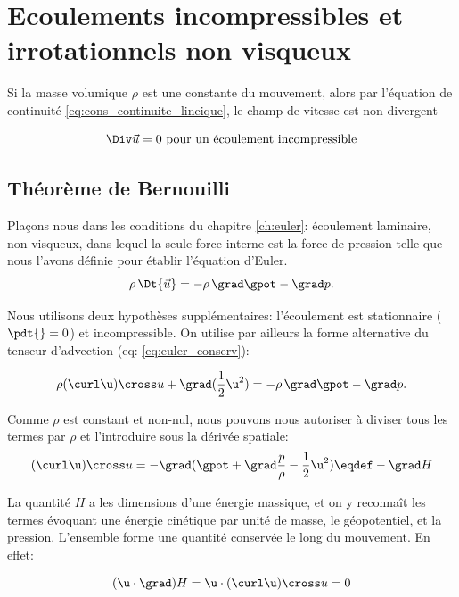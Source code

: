 \chapter{Ecoulements incompressibles et irrotationnels non visqueux}

Si la masse volumique $\rho$ est une constante du mouvement, alors par l'équation de continuité \eqref{eq:cons_continuite_lineique}, le champ de vitesse est non-divergent

\begin{equation}
  \Div \vec{u} = 0\text{ pour un écoulement incompressible}
\end{equation}


\section{Théorème de Bernouilli}

Plaçons nous dans les conditions du chapitre \ref{ch:euler}: écoulement laminaire, non-visqueux, dans lequel la seule force interne est la force de pression telle que nous l'avons définie pour établir l'équation d'Euler. 
\begin{equation}
  \rho \, \Dt{\vec{u}} = - \rho \, \grad \gpot - \grad p.
\end{equation}

Nous utilisons deux hypothèses supplémentaires: l'écoulement est stationnaire ($\pdt{}=0$) et incompressible. On utilise par ailleurs la forme alternative du tenseur d'advection (eq: \ref{eq:euler_conserv}):

\begin{equation}
  \rho (\curl \u)\cross u + \grad(\frac{1}{2}\u^2) = - \rho \, \grad \gpot - \grad p.
\label{eq:Bernouilli0}
\end{equation}

Comme $\rho$ est constant et non-nul, nous pouvons nous autoriser à diviser tous les termes par $\rho$ et l'introduire sous la dérivée spatiale: 
\begin{equation}
  (\curl \u)\cross u = - \grad (\gpot + \grad \frac{p}{\rho} - \frac{1}{2}\u^2) \eqdef - \grad H
\label{eq:Bernouilli}
\end{equation}

La quantité $H$ a les dimensions d'une énergie massique, et on y reconnaît les termes évoquant une énergie cinétique par unité de masse, le géopotentiel, et la pression. L'ensemble forme une quantité conservée le long du mouvement. En effet: 

\begin{equation}
  (\u \cdot \grad) H = \u \cdot  (\curl \u)\cross u  = 0
\end{equation}

